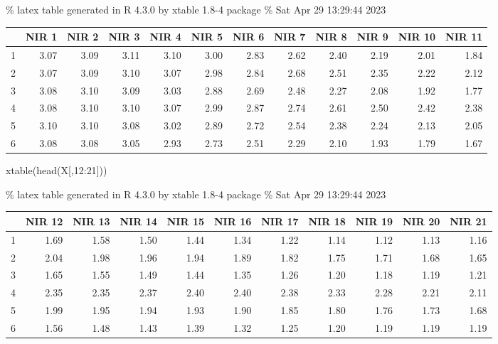 \documentclass[
]{article}
\newenvironment{Shaded}{\begin{snugshade}}{\end{snugshade}}
\newcommand{\DecValTok}[1]{\textcolor[rgb]{0.00,0.00,0.81}{#1}}
\newcommand{\FunctionTok}[1]{\textcolor[rgb]{0.00,0.00,0.00}{#1}}
\newcommand{\NormalTok}[1]{#1}
\newcommand{\SpecialCharTok}[1]{\textcolor[rgb]{0.00,0.00,0.00}{#1}}
\begin{document}
\% latex table generated in R 4.3.0 by xtable 1.8-4 package \% Sat Apr
29 13:29:44 2023

\begin{table}[ht]
\centering
\begin{tabular}{rrrrrrrrrrrr}
  \hline
 & NIR 1 & NIR 2 & NIR 3 & NIR 4 & NIR 5 & NIR 6 & NIR 7 & NIR 8 & NIR 9 & NIR 10 & NIR 11 \\ 
  \hline
1 & 3.07 & 3.09 & 3.11 & 3.10 & 3.00 & 2.83 & 2.62 & 2.40 & 2.19 & 2.01 & 1.84 \\ 
  2 & 3.07 & 3.09 & 3.10 & 3.07 & 2.98 & 2.84 & 2.68 & 2.51 & 2.35 & 2.22 & 2.12 \\ 
  3 & 3.08 & 3.10 & 3.09 & 3.03 & 2.88 & 2.69 & 2.48 & 2.27 & 2.08 & 1.92 & 1.77 \\ 
  4 & 3.08 & 3.10 & 3.10 & 3.07 & 2.99 & 2.87 & 2.74 & 2.61 & 2.50 & 2.42 & 2.38 \\ 
  5 & 3.10 & 3.10 & 3.08 & 3.02 & 2.89 & 2.72 & 2.54 & 2.38 & 2.24 & 2.13 & 2.05 \\ 
  6 & 3.08 & 3.08 & 3.05 & 2.93 & 2.73 & 2.51 & 2.29 & 2.10 & 1.93 & 1.79 & 1.67 \\ 
   \hline
\end{tabular}
\end{table}

\begin{Shaded}
\begin{Highlighting}[]
\FunctionTok{xtable}\NormalTok{(}\FunctionTok{head}\NormalTok{(X[,}\DecValTok{12}\SpecialCharTok{:}\DecValTok{21}\NormalTok{]))}
\end{Highlighting}
\end{Shaded}

\% latex table generated in R 4.3.0 by xtable 1.8-4 package \% Sat Apr
29 13:29:44 2023

\begin{table}[ht]
\centering
\begin{tabular}{rrrrrrrrrrr}
  \hline
 & NIR 12 & NIR 13 & NIR 14 & NIR 15 & NIR 16 & NIR 17 & NIR 18 & NIR 19 & NIR 20 & NIR 21 \\ 
  \hline
1 & 1.69 & 1.58 & 1.50 & 1.44 & 1.34 & 1.22 & 1.14 & 1.12 & 1.13 & 1.16 \\ 
  2 & 2.04 & 1.98 & 1.96 & 1.94 & 1.89 & 1.82 & 1.75 & 1.71 & 1.68 & 1.65 \\ 
  3 & 1.65 & 1.55 & 1.49 & 1.44 & 1.35 & 1.26 & 1.20 & 1.18 & 1.19 & 1.21 \\ 
  4 & 2.35 & 2.35 & 2.37 & 2.40 & 2.40 & 2.38 & 2.33 & 2.28 & 2.21 & 2.11 \\ 
  5 & 1.99 & 1.95 & 1.94 & 1.93 & 1.90 & 1.85 & 1.80 & 1.76 & 1.73 & 1.68 \\ 
  6 & 1.56 & 1.48 & 1.43 & 1.39 & 1.32 & 1.25 & 1.20 & 1.19 & 1.19 & 1.19 \\ 
   \hline
\end{tabular}
\end{table}
\end{document}
